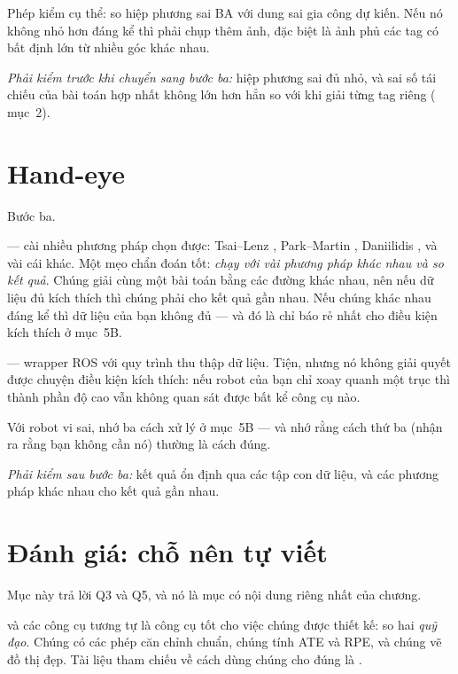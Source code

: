\documentclass[../../marker.tex]{subfiles}
\begin{document}
Phép kiểm cụ thể: so hiệp phương sai BA với dung sai gia công dự kiến. Nếu nó không nhỏ hơn đáng kể thì phải chụp thêm ảnh, đặc biệt là ảnh phủ các tag có bất định lớn từ nhiều góc khác nhau.

\emph{Phải kiểm trước khi chuyển sang bước ba:} hiệp phương sai đủ nhỏ, và sai số tái chiếu của bài toán hợp nhất không lớn hơn hẳn so với khi giải từng tag riêng ( mục~2).

\section{Hand-eye}

Bước ba.

\emph{ } --- cài nhiều phương pháp chọn được: Tsai--Lenz \cite{tsai1989handeye}, Park--Martin \cite{park1994robot}, Daniilidis \cite{daniilidis1999handeye}, và vài cái khác. Một mẹo chẩn đoán tốt: \emph{chạy với vài phương pháp khác nhau và so kết quả}. Chúng giải cùng một bài toán bằng các đường khác nhau, nên nếu dữ liệu đủ kích thích thì chúng phải cho kết quả gần nhau. Nếu chúng khác nhau đáng kể thì dữ liệu của bạn không đủ --- và đó là chỉ báo rẻ nhất cho điều kiện kích thích ở  mục~5B.

\emph{} --- wrapper ROS với quy trình thu thập dữ liệu. Tiện, nhưng nó không giải quyết được chuyện điều kiện kích thích: nếu robot của bạn chỉ xoay quanh một trục thì thành phần độ cao vẫn không quan sát được bất kể công cụ nào.

Với robot vi sai, nhớ ba cách xử lý ở  mục~5B --- và nhớ rằng cách thứ ba (nhận ra rằng bạn không cần nó) thường là cách đúng.

\emph{Phải kiểm sau bước ba:} kết quả ổn định qua các tập con dữ liệu, và các phương pháp khác nhau cho kết quả gần nhau.

\section{Đánh giá: chỗ nên tự viết}

Mục này trả lời Q3 và Q5, và nó là mục có nội dung riêng nhất của chương.

 \cite{grupp2017evo} và các công cụ tương tự là công cụ tốt cho việc chúng được thiết kế: so hai \emph{quỹ đạo}. Chúng có các phép căn chỉnh chuẩn, chúng tính ATE và RPE, và chúng vẽ đồ thị đẹp. Tài liệu tham chiếu về cách dùng chúng cho đúng là \cite{zhang2018tutorial}.
\end{document}
